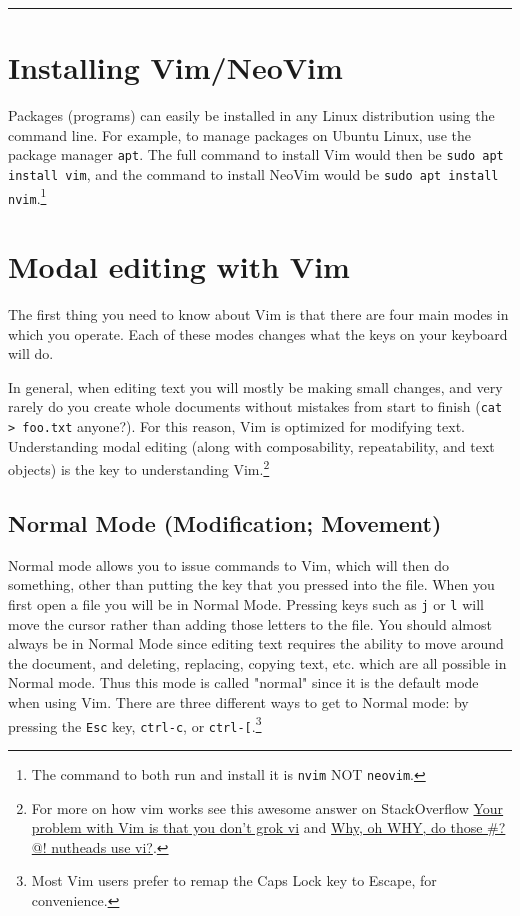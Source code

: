 \documentclass[11pt]{article}
\begin{document}
\noindent\rule{\textwidth}{0.5pt}

\newpage

\section{Installing Vim/NeoVim}
\label{sec:org068533c}
Packages (programs) can easily be installed in any Linux distribution using the
command line. For example, to manage packages on Ubuntu Linux, use the package
manager \texttt{apt}. The full command to install Vim would then be \texttt{sudo apt install
vim}, and the command to install NeoVim would be \texttt{sudo apt install nvim}.\footnote{The command to both run and install it is \texttt{nvim} NOT \texttt{neovim}.}
\section{Modal editing with Vim}
\label{sec:org879d9cd}
The first thing you need to know about Vim is that there are four main modes in
which you operate. Each of these modes changes what the keys on your keyboard
will do.

In general, when editing text you will mostly be making small changes, and very
rarely do you create whole documents without mistakes from start to finish (\texttt{cat
> foo.txt} anyone?). For this reason, Vim is optimized for modifying text.
Understanding modal editing (along with composability, repeatability, and text
objects) is the key to understanding Vim.\footnote{For more on how vim works see this awesome answer on StackOverflow
\href{https://stackoverflow.com/questions/1218390/what-is-your-most-productive-shortcut-with-vim}{Your problem with Vim is that you don't grok vi} and \href{http://www.viemu.com/a-why-vi-vim.html}{Why, oh WHY, do those \#?@!
nutheads use vi?}.}
\subsection{Normal Mode (Modification; Movement)}
\label{sec:orgea68d30}
Normal mode allows you to issue commands to Vim, which will then do something,
other than putting the key that you pressed into the file. When you first open a
file you will be in Normal Mode. Pressing keys such as \texttt{j} or \texttt{l} will move the
cursor rather than adding those letters to the file. You should almost always be
in Normal Mode since editing text requires the ability to move around the
document, and deleting, replacing, copying text, etc. which are all possible in
Normal mode. Thus this mode is called "normal" since it is the default mode when
using Vim. There are three different ways to get to Normal mode: by pressing
the \texttt{Esc} key, \texttt{ctrl-c}, or \texttt{ctrl-[}.\footnote{Most Vim users prefer to remap the Caps Lock key to Escape, for 
convenience.} 
\end{document}
